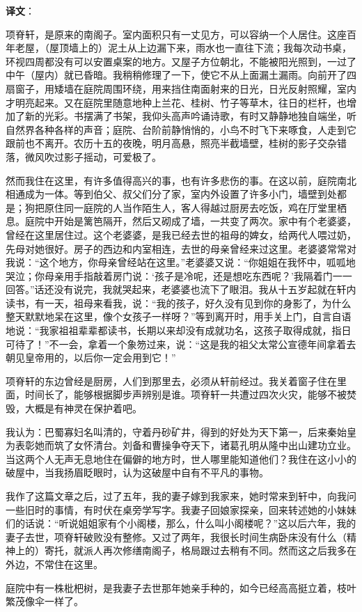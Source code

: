 \documentclass[12pt,UTF-8,openany]{ctexbook}
\begin{document}
\textbf{译文}：

\vspace{1em}

\begin{normalsize}
    
    项脊轩，是原来的南阁子。室内面积只有一丈见方，可以容纳一个人居住。这座百年老屋，（屋顶墙上的）泥土从上边漏下来，雨水也一直往下流；我每次动书桌，环视四周都没有可以安置桌案的地方。又屋子方位朝北，不能被阳光照到，一过了中午（屋内）就已昏暗。我稍稍修理了一下，使它不从上面漏土漏雨。向前开了四扇窗子，用矮墙在庭院周围环绕，用来挡住南面射来的日光，日光反射照耀，室内才明亮起来。又在庭院里随意地种上兰花、桂树、竹子等草木，往日的栏杆，也增加了新的光彩。书摆满了书架，我仰头高声吟诵诗歌，有时又静静地独自端坐，听自然界各种各样的声音；庭院、台阶前静悄悄的，小鸟不时飞下来啄食，人走到它跟前也不离开。农历十五的夜晚，明月高悬，照亮半截墙壁，桂树的影子交杂错落，微风吹过影子摇动，可爱极了。
    
    然而我住在这里，有许多值得高兴的事，也有许多悲伤的事。在这以前，庭院南北相通成为一体。等到伯父、叔父们分了家，室内外设置了许多小门，墙壁到处都是；狗把原住同一庭院的人当作陌生人，客人得越过厨房去吃饭，鸡在厅堂里栖息。庭院中开始是篱笆隔开，然后又砌成了墙，一共变了两次。家中有个老婆婆，曾经在这里居住过。这个老婆婆，是我已经去世的祖母的婢女，给两代人喂过奶，先母对她很好。房子的西边和内室相连，去世的母亲曾经来过这里。老婆婆常常对我说：“这个地方，你母亲曾经站在这里。”老婆婆又说：“你姐姐在我怀中，呱呱地哭泣；你母亲用手指敲着房门说：‘孩子是冷呢，还是想吃东西呢？’我隔着门一一回答。”话还没有说完，我就哭起来，老婆婆也流下了眼泪。我从十五岁起就在轩内读书，有一天，祖母来看我，说：“我的孩子，好久没有见到你的身影了，为什么整天默默地呆在这里，像个女孩子一样呀？”等到离开时，用手关上门，自言自语地说：“我家祖祖辈辈都读书，长期以来却没有成就功名，这孩子取得成就，指日可待了！”不一会，拿着一个象笏过来，说：“这是我的祖父太常公宣德年间拿着去朝见皇帝用的，以后你一定会用到它！”
    
    项脊轩的东边曾经是厨房，人们到那里去，必须从轩前经过。我关着窗子住在里面，时间长了，能够根据脚步声辨别是谁。项脊轩一共遭过四次火灾，能够不被焚毁，大概是有神灵在保护着吧。
    
    我认为：巴蜀寡妇名叫清的，守着丹砂矿井，得到的好处为天下第一，后来秦始皇为表彰她而筑了女怀清台。刘备和曹操争夺天下，诸葛孔明从隆中出山建功立业。当这两个人无声无息地住在偏僻的地方时，世人哪里能知道他们？我住在这小小的破屋中，当我扬眉眨眼时，认为这破屋中自有不平凡的事物。
    
    我作了这篇文章之后，过了五年，我的妻子嫁到我家来，她时常来到轩中，向我问一些旧时的事情，有时伏在桌旁学写字。我妻子回娘家探亲，回来转述她的小妹妹们的话说：“听说姐姐家有个小阁楼，那么，什么叫小阁楼呢？”这以后六年，我的妻子去世，项脊轩破败没有整修。又过了两年，我很长时间生病卧床没有什么（精神上的）寄托，就派人再次修缮南阁子，格局跟过去稍有不同。然而这之后我多在外边，不常住在这里。
    
    庭院中有一株枇杷树，是我妻子去世那年她亲手种的，如今已经高高挺立着，枝叶繁茂像伞一样了。
    
\end{normalsize}
\end{document}
